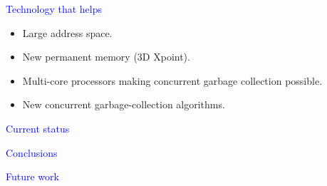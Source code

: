 \documentclass{slides}
\newcommand{\ti}[1]{\begin{center}\Large{\textcolor{blue}{#1}}\end{center}}
\begin{document}
\begin{slide}\ti{}

\vfill\end{slide}
\begin{slide}\ti{}

\vfill\end{slide}
\begin{slide}\ti{Technology that helps}

  \begin{itemize}
  \item Large address space.
  \item New permanent memory (3D Xpoint).
  \item Multi-core processors making concurrent garbage collection
    possible. 
  \item New concurrent garbage-collection algorithms.
  \end{itemize}

\vfill\end{slide}
\begin{slide}\ti{Current status}
\vfill\end{slide}
\begin{slide}\ti{Conclusions}

\vfill\end{slide}
\begin{slide}\ti{Future work}

\vfill\end{slide}



\end{document}
